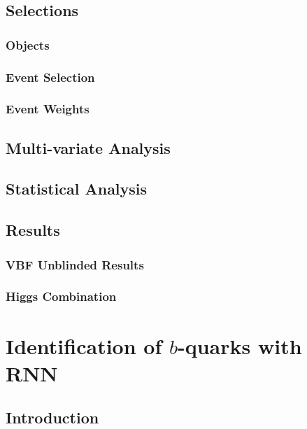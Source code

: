 \documentclass{report}
\begin{document}
\section{Selections}
\subsection{Objects}

\subsection{Event Selection}

\subsection{Event Weights}

\clearpage

\section{Multi-variate Analysis}

\clearpage

\section{Statistical Analysis}

\clearpage

\section{Results}
\subsection{VBF \Hbb Unblinded Results}

\clearpage
\subsection{Higgs Combination}


\clearpage


\chapter{Identification of $b$-quarks with RNN}
\label{chap:btagging}
\section{Introduction}

\clearpage
\end{document}
